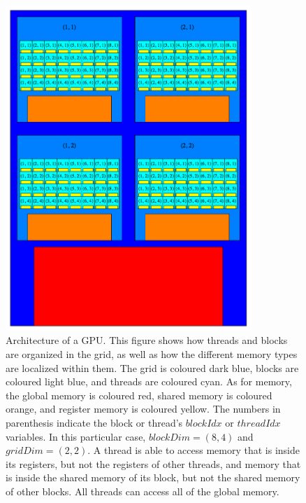 \documentclass[12pt]{report}
\begin{document}
\begin{figure}[h!]
\center
\includegraphics[width=0.83\textwidth]{Figures/gpu_arc.png}
\caption[Architecture of a GPU]
{Architecture of a GPU. This figure shows how threads and blocks are organized in the grid, as well as how the different memory types are localized within them. The grid is coloured dark blue, blocks are coloured light blue, and threads are coloured cyan. As for memory, the global memory is coloured red, shared memory is coloured orange, and register memory is coloured yellow. The numbers in parenthesis indicate the block or thread's $blockIdx$ or $threadIdx$ variables. In this particular case, $blockDim=(8,4)$ and $gridDim=(2,2)$. A thread is able to access memory that is inside its registers, but not the registers of other threads, and memory that is inside the shared memory of its block, but not the shared memory of other blocks. All threads can access all of the global memory.}
\label{fig:gpuarc}
\end{figure}

\clearpage
\end{document}
